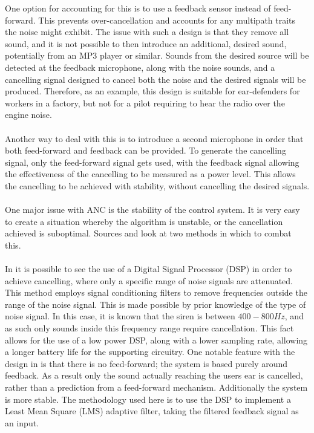 One option for accounting for this is to use a feedback sensor instead of feed-forward.
This prevents over-cancellation and accounts for any multipath traits the noise might exhibit.
The issue with such a design is that they remove all sound, and it is not possible to then introduce an additional, desired sound, potentially from an MP3 player or similar.
Sounds from the desired source will be detected at the feedback microphone, along with the noise sounds, and a cancelling signal designed to cancel both the noise and the desired signals will be produced.
Therefore, as an example, this design is suitable for ear-defenders for workers in a factory, but not for a pilot requiring to hear the radio over the engine noise.
\\
\\
Another way to deal with this is to introduce a second microphone \cite{EMNoiseCancel,2SensorANCAlg} in order that both feed-forward and feedback can be provided.
To generate the cancelling signal, only the feed-forward signal gets used, with the feedback signal allowing the effectiveness of the cancelling to be measured as a power level.
This allows the cancelling to be achieved with stability, without cancelling the desired signals.
\\
\\
One major issue with ANC is the stability of the control system.
It is very easy to create a situation whereby the algorithm is unstable, or the cancellation achieved is suboptimal.
Sources \cite{AuralEnvironmentAdjANC} and \cite{ANCOptimalControlInf} look at two methods in which to combat this.
\\
\\
In \cite{EMHeadsets} it is possible to see the use of a Digital Signal Processor (DSP) in order to achieve cancelling, where only a specific range of noise signals are attenuated.
This method employs signal conditioning filters to remove frequencies outside the range of the noise signal.
This is made possible by prior knowledge of the type of noise signal.
In this case, it is known that the siren is between $400-800Hz$, and as such only sounds inside this frequency range require cancellation.
This fact allows for the use of a low power DSP, along with a lower sampling rate, allowing a longer battery life for the supporting circuitry.
One notable feature with the design in \cite{EMHeadsets} is that there is no feed-forward; the system is based purely around feedback.
As a result only the sound actually reaching the users ear is cancelled, rather than a prediction from a feed-forward mechanism.
Additionally the system is more stable.
The methodology used here is to use the DSP to implement a Least Mean Square (LMS) adaptive filter, taking the filtered feedback signal as an input.

